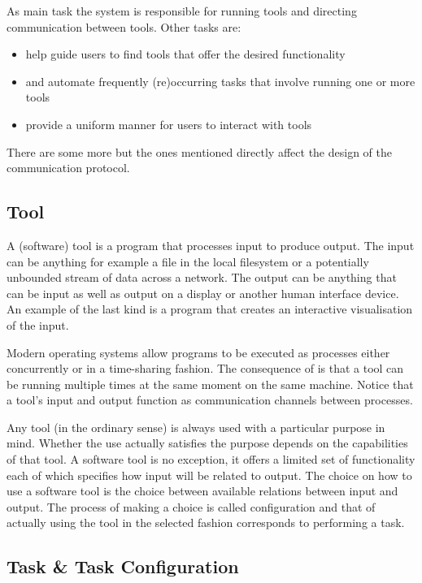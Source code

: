 \documentclass{article}
\begin{document}
   As main task the system is responsible for running tools and directing
   communication between tools. Other tasks are:
   
    \begin{itemize}
     \item help guide users to find tools that offer the desired functionality
     \item and automate frequently (re)occurring tasks that involve running one or more tools
     \item provide a uniform manner for users to interact with tools
    \end{itemize}

   There are some more but the ones mentioned directly affect the design of the
   communication protocol.

  \subsection{Tool}

   A (software) tool is a program that processes input to produce output. The
   input can be anything for example a file in the local filesystem or a
   potentially unbounded stream of data across a network. The output can be
   anything that can be input as well as output on a display or another human
   interface device. An example of the last kind is a program that creates an
   interactive visualisation of the input.
   
   Modern operating systems allow programs to be executed as processes either
   concurrently or in a time-sharing fashion. The consequence of is that a tool
   can be running multiple times at the same moment on the same machine. Notice
   that a tool's input and output function as communication channels between
   processes. %

   Any tool (in the ordinary sense) is always used with a particular purpose in
   mind. Whether the use actually satisfies the purpose depends on the
   capabilities of that tool. A software tool is no exception, it offers a
   limited set of functionality each of which specifies how input will be
   related to output.  The choice on how to use a software tool is the choice
   between available relations between input and output.  The process of making
   a choice is called configuration and that of actually using the tool in the
   selected fashion corresponds to performing a task.

  \subsection{Task \& Task Configuration} \label{concepts::task_configuration}
\end{document}
